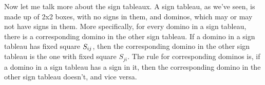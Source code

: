 \documentclass[12pt]{article}
\numberwithin{equation}{section}
\theoremstyle{definition}
\theoremstyle{remark}
\begin{document}
  Now let me talk more about the sign tableaux.
  A sign tableau, as we've seen, is made up of 2x2 boxes, with no signs in them, and dominos, which may or may not have signs in them.
  More specifically, for every domino in a sign tableau, there is a corresponding domino in the other sign tableau.
  If a domino in a sign tableau has fixed square ${S_{ij}}$, then the corresponding domino in the other sign tableau is the one with fixed square $S_{ji}$.
  The rule for corresponding dominos is, if a domino in a sign tableau has a sign in it, then the corresponding domino in the other sign tableau doesn't, and vice versa.

  
  
\end{document}
